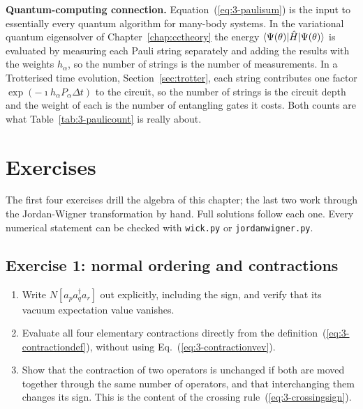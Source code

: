 \begin{notebox}
\textbf{Quantum-computing connection.} Equation~(\ref{eq:3-paulisum}) is the
input to essentially every quantum algorithm for many-body systems.  In the
variational quantum eigensolver of Chapter~\ref{chap:cctheory} the energy
$\langle \Psi(\theta) | \hat{H} | \Psi(\theta) \rangle$ is evaluated by measuring
each Pauli string separately and adding the results with the weights
$h_{\alpha}$, so the number of strings is the number of measurements.  In a
Trotterised time evolution, Section~\ref{sec:trotter}, each string
contributes one factor $\exp(-\imath h_{\alpha}P_{\alpha}\Delta t)$ to the
circuit, so the number of strings is the circuit depth and the weight of each
is the number of entangling gates it costs.  Both counts are what
Table~\ref{tab:3-paulicount} is really about.
\end{notebox}

\section{Exercises}

The first four exercises drill the algebra of this chapter; the last two work
through the Jordan-Wigner transformation by hand.  Full solutions follow each
one.  Every numerical statement can be checked with \texttt{wick.py} or
\texttt{jordanwigner.py}.

\subsection*{Exercise 1: normal ordering and contractions}
\label{ex:3-normalordering}

\begin{enumerate}
  \item[a)] Write $N\left[a_p a_q^{\dagger} a_r\right]$ out explicitly,
  including the sign, and verify that its vacuum expectation value vanishes.
  \item[b)] Evaluate all four elementary contractions directly from the
  definition~(\ref{eq:3-contractiondef}), without using
  Eq.~(\ref{eq:3-contractionvev}).
  \item[c)] Show that the contraction of two operators is unchanged if both
  are moved together through the same number of operators, and that
  interchanging them changes its sign.  This is the content of the crossing
  rule~(\ref{eq:3-crossingsign}).
\end{enumerate}

